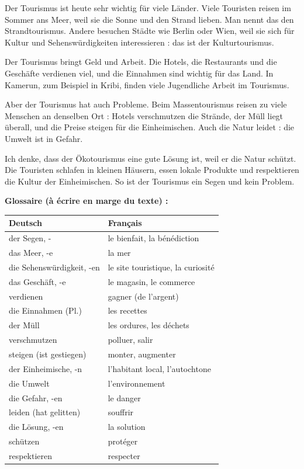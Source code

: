 \documentclass[11pt]{article}
\begin{document}
\begin{textebox}
Der Tourismus ist heute sehr wichtig für viele Länder. Viele Touristen reisen im Sommer ans Meer, weil sie die Sonne und den Strand lieben. Man nennt das den Strandtourismus. Andere besuchen Städte wie Berlin oder Wien, weil sie sich für Kultur und Sehenswürdigkeiten interessieren : das ist der Kulturtourismus.

Der Tourismus bringt Geld und Arbeit. Die Hotels, die Restaurants und die Geschäfte verdienen viel, und die Einnahmen sind wichtig für das Land. In Kamerun, zum Beispiel in Kribi, finden viele Jugendliche Arbeit im Tourismus.

Aber der Tourismus hat auch Probleme. Beim Massentourismus reisen zu viele Menschen an denselben Ort : Hotels verschmutzen die Strände, der Müll liegt überall, und die Preise steigen für die Einheimischen. Auch die Natur leidet : die Umwelt ist in Gefahr.

Ich denke, dass der Ökotourismus eine gute Lösung ist, weil er die Natur schützt. Die Touristen schlafen in kleinen Häusern, essen lokale Produkte und respektieren die Kultur der Einheimischen. So ist der Tourismus ein Segen und kein Problem.
\end{textebox}

\textbf{Glossaire (à écrire en marge du texte) :}

\begin{center}
\begin{tabularx}{\linewidth}{|X|X|}\hline
\rowcolor{popblueL} \textbf{Deutsch} & \textbf{Français} \\ \hline
der Segen, - & le bienfait, la bénédiction \\ \hline
das Meer, -e & la mer \\ \hline
die Sehenswürdigkeit, -en & le site touristique, la curiosité \\ \hline
das Geschäft, -e & le magasin, le commerce \\ \hline
verdienen & gagner (de l'argent) \\ \hline
die Einnahmen (Pl.) & les recettes \\ \hline
der Müll & les ordures, les déchets \\ \hline
verschmutzen & polluer, salir \\ \hline
steigen (ist gestiegen) & monter, augmenter \\ \hline
der Einheimische, -n & l'habitant local, l'autochtone \\ \hline
die Umwelt & l'environnement \\ \hline
die Gefahr, -en & le danger \\ \hline
leiden (hat gelitten) & souffrir \\ \hline
die Lösung, -en & la solution \\ \hline
schützen & protéger \\ \hline
respektieren & respecter \\ \hline
\end{tabularx}
\end{center}
\end{document}
